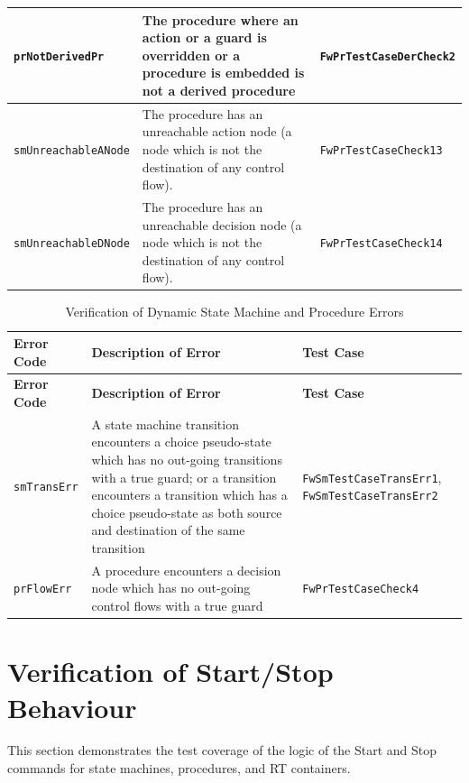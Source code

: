 \documentclass[a4paper,10pt]{article}
\let\stdsection\section
\renewcommand\section{\newpage\stdsection}
\begin{document}
\begin{longtable}{|p{3cm}|p{3.7cm}|p{4.5cm}|}
\hline
\texttt{prNotDerivedPr} & The procedure where an action or a guard is overridden or a procedure is embedded is not a derived procedure
& \texttt{FwPrTestCaseDerCheck2} \\
\hline
\texttt{smUnreachableANode} & The procedure has an unreachable action node (a node which is not the destination of any control flow). 
& \texttt{FwPrTestCaseCheck13} \\
\hline
\texttt{smUnreachableDNode} & The procedure has an unreachable decision node (a node which is not the destination of any control flow). 
& \texttt{FwPrTestCaseCheck14} \\
\hline
\end{longtable}


\begin{longtable}{|p{3cm}|p{4.2cm}|p{4cm}|}
\caption{Verification of Dynamic State Machine and Procedure Errors}\label{tab:Dyn_Error} \\
\hline
\rowcolor{gray}
\textbf{Error Code} & \textbf{Description of Error} & \textbf{Test Case} \\
\hline
\endfirsthead
\rowcolor{gray}
\textbf{Error Code} & \textbf{Description of Error} & \textbf{Test Case} \\
\hline
\endhead
\texttt{smTransErr} & A state machine transition encounters a choice pseudo-state 
which has no out-going transitions 
with a true guard; or a transition encounters a transition which has a choice pseudo-state 
as both source and destination of the same transition & \texttt{FwSmTestCaseTransErr1}, 
\texttt{FwSmTestCaseTransErr2} \\
\hline
\texttt{prFlowErr} & A procedure encounters a decision node which has no out-going 
control flows with a true guard & \texttt{FwPrTestCaseCheck4} \\
\hline
\end{longtable}

\section{Verification of Start/Stop Behaviour}
This section demonstrates the test coverage of the logic of the Start and Stop commands 
for state machines, procedures, and RT containers.
\end{document}
